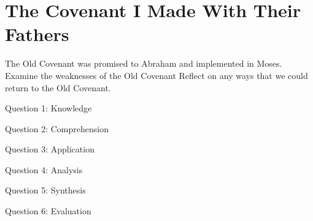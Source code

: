 \chapter{The Covenant I Made With Their Fathers}

\begin{goals}
\goal The Old Covenant was promised to Abraham and implemented in Moses.
\goal Examine the weaknesses of the Old Covenant
\goal Reflect on any ways that we could return to the Old Covenant.
\end{goals}

\intro

\lipsum[4]

\bible

\begin{quote}
\lipsum[4] 
\end{quote}

\begin{quote}
\lipsum[4] 
\end{quote}

\begin{quote}
\lipsum[4] 
\end{quote}

\begin{quote}
\lipsum[4] 
\end{quote}

\discussion

\lipsum[5-7]

\questions

Question 1: Knowledge
\vfill

Question 2: Comprehension
\vfill

Question 3: Application
\vfill

Question 4: Analysis
\vfill

Question 5: Synthesis
\vfill

Question 6: Evaluation
\vfill